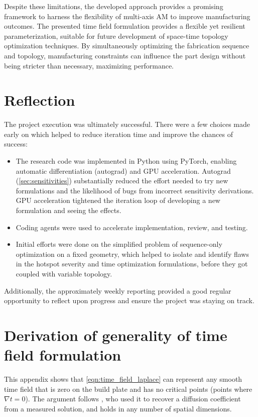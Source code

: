 \documentclass{article}
\begin{document}
Despite these limitations, the developed approach provides a promising framework to harness the flexibility of multi-axis AM to improve manufacturing outcomes.
The presented time field formulation provides a flexible yet resilient parameterization, suitable for future development of space-time topology optimization techniques.
By simultaneously optimizing the fabrication sequence and topology, manufacturing constraints can influence the part design without being stricter than necessary, maximizing performance.

\section{Reflection}
The project execution was ultimately successful. There were a few choices made early on which helped to reduce iteration time and improve the chances of success:
\begin{itemize}
    \item The research code was implemented in Python using PyTorch, enabling automatic differentiation (autograd) and GPU acceleration. Autograd (\autoref{sec:sensitivities}) substantially reduced the effort needed to try new formulations and the likelihood of bugs from incorrect sensitivity derivations. GPU acceleration tightened the iteration loop of developing a new formulation and seeing the effects.
    \item Coding agents were used to accelerate implementation, review, and testing.
    \item Initial efforts were done on the simplified problem of sequence-only optimization on a fixed geometry, which helped to isolate and identify flaws in the hotspot severity and time optimization formulations, before they got coupled with variable topology.
\end{itemize}

Additionally, the approximately weekly reporting provided a good regular opportunity to reflect upon progress and ensure the project was staying on track.

\clearpage

\appendix
\section{Derivation of generality of time field formulation}
\label{sec:time_field_generality}

This appendix shows that \autoref{eqn:time_field_laplace} can represent any smooth time field that is zero on the build plate and has no critical points (points where $\nabla t = 0$).
The argument follows \cite{richter1981inverse}, who used it to recover a diffusion coefficient from a measured solution, and holds in any number of spatial dimensions.
\end{document}
